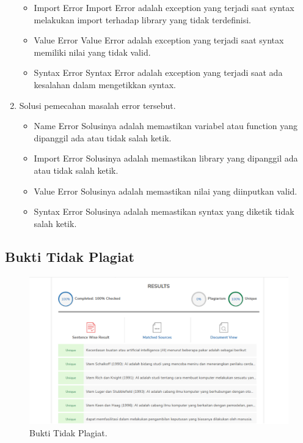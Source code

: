 \begin{enumerate}
\begin{itemize}
		\item Import Error
		\hfill\break
		Import Error adalah exception yang terjadi saat syntax melakukan import terhadap library yang tidak terdefinisi.
		\item Value Error
		\hfill\break
		Value Error adalah exception yang terjadi saat syntax memiliki nilai yang tidak valid.
		\item Syntax Error
		\hfill\break
		Syntax Error adalah exception yang terjadi saat ada kesalahan dalam mengetikkan syntax.
	\end{itemize}
	\item Solusi pemecahan masalah error tersebut.
	\begin{itemize}
		\item Name Error
		\hfill\break
		Solusinya adalah memastikan variabel atau function yang dipanggil ada atau tidak salah ketik.
		\item Import Error
		\hfill\break
		Solusinya adalah memastikan library yang dipanggil ada atau tidak salah ketik.
		\item Value Error
		\hfill\break
		Solusinya adalah memastikan nilai yang diinputkan valid.
		\item Syntax Error
		\hfill\break
		Solusinya adalah memastikan syntax yang diketik tidak salah ketik.
	\end{itemize}
\end{enumerate}

\subsection{Bukti Tidak Plagiat}
\begin{figure}[H]
	\includegraphics[width=8 cm]{figures/1174006/chapter1/plagiat.png}
	\centering
	\caption{Bukti Tidak Plagiat.}
\end{figure}